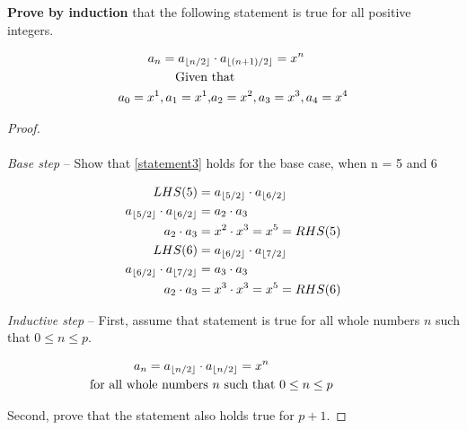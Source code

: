 \documentclass{article}
\begin{document}
\textbf{Prove by induction} that the following statement is true for all positive integers.

\begin{align}
    \label{statement3}
    a_n = a_{\lfloor n/2 \rfloor} &\cdot a_{\lfloor (n+1)/2 \rfloor} = x^n\notag\\
    &\hspace{-1cm} \text{Given that}\notag\\
    a_0=x^1, a_1=x^1, &a_2=x^2, a_3=x^3, a_4=x^4
\end{align}

\begin{proof}

\textit{\\\\Base step} -- Show that \cref{statement3} holds for the base case, when n = 5 and 6  

\begin{align}
    \label{basestep}
    LHS(5) &= a_{\lfloor 5/2 \rfloor} \cdot a_{\lfloor 6/2 \rfloor}\notag\\
    a_{\lfloor 5/2 \rfloor} \cdot a_{\lfloor 6/2 \rfloor} &= a_2 \cdot a_3\notag\\
    a_2 \cdot a_3 &= x^2 \cdot x^3 = x^5 = RHS(5)\notag\\
    LHS(6) &= a_{\lfloor 6/2 \rfloor} \cdot a_{\lfloor 7/2 \rfloor}\notag\\
    a_{\lfloor 6/2 \rfloor} \cdot a_{\lfloor 7/2 \rfloor} &= a_3 \cdot a_3\notag\\
    a_2 \cdot a_3 &= x^3 \cdot x^3 = x^5 = RHS(6)
\end{align}

\textit{Inductive step} -- First, assume that statement is true for all whole numbers \( n \) such that \( 0 \leq n \leq p \).

\begin{align}
    \label{assumption}
    a_n = a_{\lfloor n/2 \rfloor} &\cdot a_{\lfloor n/2 \rfloor} = x^n\notag\\
    &\hspace{-3cm} \text{for all whole numbers \( n \) such that \( 0 \leq n \leq p \)}
\end{align}

Second, prove that the statement also holds true for $p+1$.


\end{proof}
\end{document}
